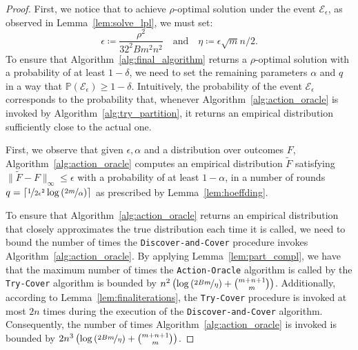 \finaltheorem*
\begin{proof}
First, we notice that to achieve $\rho$-optimal solution under the event $\mathcal{E}_\epsilon$, as observed in Lemma~\ref{lem:solve_lpl}, we must set:
\begin{equation}\label{eq_epsilon_parameter}
\epsilon \coloneqq \frac{\rho^2}{32^2 B m^2 n^2} \quad \text{and} \quad \eta \coloneqq \epsilon \sqrt{m} n /2.
\end{equation}
To ensure that Algorithm~\ref{alg:final_algorithm} returns a $\rho$-optimal solution with a probability of at least $1-\delta$, we need to set the remaining parameters $\alpha$ and $q$ in a way that $\mathbb{P}(\mathcal{E}_\epsilon) \geq 1 - \delta$. Intuitively, the probability of the event $\mathcal{E}_\epsilon$ corresponds to the probability that, whenever Algorithm~\ref{alg:action_oracle} is invoked by Algorithm~\ref{alg:try_partition}, it returns an empirical distribution sufficiently close to the actual one.

First, we observe that given $\epsilon,\alpha$ and a distribution over outcomes $F$, Algorithm~\ref{alg:action_oracle} computes an empirical distribution $\widetilde{F}$ satisfying $\| \widetilde{F} - F\|_{\infty} \le \epsilon$ with a probability of at least $1-\alpha$, in a number of rounds $q=\left\lceil \nicefrac{1}{2 \epsilon^2} \log \left(\nicefrac{2 m}{\alpha}\right) \right\rceil$ as prescribed by Lemma~\ref{lem:hoeffding}.

To ensure that Algorithm~\ref{alg:action_oracle} returns an empirical distribution that closely approximates the true distribution each time it is called, we need to bound the number of times the \texttt{Discover-and-Cover} procedure invokes Algorithm~\ref{alg:action_oracle}. By applying Lemma~\ref{lem:part_compl}, we have that the maximum number of times the \texttt{Action-Oracle} algorithm is called by the \texttt{Try-Cover} algorithm is bounded by $n^2 \left( \log \left(\nicefrac{2Bm}{\eta}\right) + \binom{ m + n +1}{m} \right)$. Additionally, according to Lemma~\ref{lem:finaliterations}, the \texttt{Try-Cover} procedure is invoked at most $2n$ times during the execution of the \texttt{Discover-and-Cover} algorithm. Consequently, the number of times Algorithm~\ref{alg:action_oracle} is invoked is bounded by $2n^3 \left( \log \left(\nicefrac{2Bm}{\eta}\right) + \binom{ m + n +1}{m} \right)$.


\end{proof}
